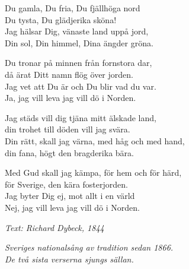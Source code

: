 \vspace{10pt}
Du gamla, Du fria, Du fjällhöga nord\\
Du tysta, Du glädjerika sköna!\\
Jag hälsar Dig, vänaste land uppå jord,\\
\revrpt Din sol, Din himmel, Dina ängder gröna.\rpt\par
\vspace{10pt}
Du tronar på minnen från fornstora dar,\\
då ärat Ditt namn flög över jorden.\\
Jag vet att Du är och Du blir vad du var.\\
\revrpt Ja, jag vill leva jag vill dö i Norden.\rpt\par
\vspace{10pt}
Jag städs vill dig tjäna mitt älskade land,\\
din trohet till döden vill jag svära.\\
Din rätt, skall jag värna, med håg och med hand,\\
\revrpt din fana, högt den bragderika bära.\rpt\par
\vspace{10pt}
Med Gud skall jag kämpa, för hem och för härd,\\
för Sverige, den kära fosterjorden.\\
Jag byter Dig ej, mot allt i en värld\\
\revrpt Nej, jag vill leva jag vill dö i Norden.\rpt\par
\vspace{10pt}
{\footnotesize\textit{Text: Richard Dybeck, 1844}}\par
\vspace{10pt}
{\footnotesize\textit{Sveriges nationalsång av tradition sedan 1866.\\
De två sista verserna sjungs sällan.}}
